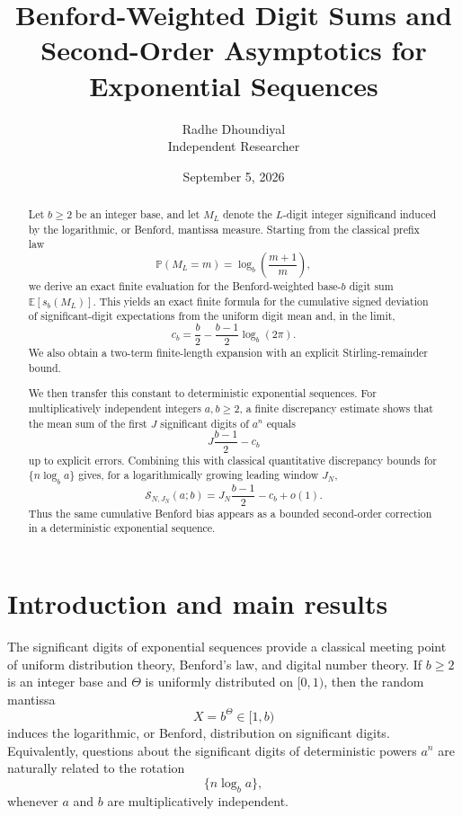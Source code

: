 \documentclass[11pt]{article}
\title{Benford-Weighted Digit Sums and Second-Order Asymptotics for Exponential Sequences}
\author{Radhe Dhoundiyal \\ \small{Independent Researcher}}
\date{September 5, 2026}
\theoremstyle{definition}
\theoremstyle{remark}
\begin{document}
\maketitle

\begin{abstract}
Let \(b\ge2\) be an integer base, and let \(M_L\) denote the
\(L\)-digit integer significand induced by the logarithmic, or Benford,
mantissa measure. Starting from the classical prefix law
\[
\mathbb P(M_L=m)=\log_b\!\left(\frac{m+1}{m}\right),
\]
we derive an exact finite evaluation for the Benford-weighted
base-\(b\) digit sum \(\mathbb E[s_b(M_L)]\). This yields an exact
finite formula for the cumulative signed deviation of significant-digit
expectations from the uniform digit mean and, in the limit,
\[
c_b=
\frac b2-\frac{b-1}{2}\log_b(2\pi).
\]
We also obtain a two-term finite-length expansion with an explicit
Stirling-remainder bound.

We then transfer this constant to deterministic exponential sequences.
For multiplicatively independent integers \(a,b\ge2\), a finite
discrepancy estimate shows that the mean sum of the first \(J\)
significant digits of \(a^n\) equals
\[
J\frac{b-1}{2}-c_b
\]
up to explicit errors. Combining this with classical quantitative
discrepancy bounds for \(\{n\log_b a\}\) gives, for a logarithmically
growing leading window \(J_N\),
\[
\mathcal S_{N,J_N}(a;b)
=
J_N\frac{b-1}{2}-c_b+o(1).
\]
Thus the same cumulative Benford bias appears as a bounded
second-order correction in a deterministic exponential sequence.
\end{abstract}


\section{Introduction and main results}
\label{sec:introduction}

The significant digits of exponential sequences provide a classical
meeting point of uniform distribution theory, Benford's law, and digital
number theory.  If \(b\ge 2\) is an integer base and
\(\Theta\) is uniformly distributed on \([0,1)\), then the random
mantissa
\[
    X=b^\Theta\in[1,b)
\]
induces the logarithmic, or Benford, distribution on significant
digits.  Equivalently, questions about the significant digits of
deterministic powers \(a^n\) are naturally related to the rotation
\[
    \{n\log_b a\},
\]
whenever \(a\) and \(b\) are multiplicatively independent.
\end{document}
